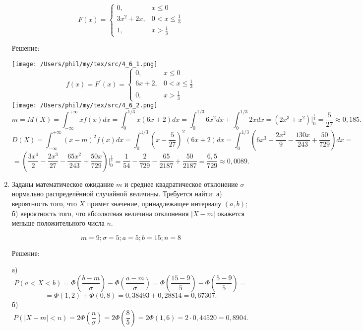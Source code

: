 \documentclass{article}
\renewcommand{\le}{\ensuremath{\leqslant}}
\begin{document}
\begin{enumerate}
\begin{equation*}
F(x) =
 \begin{cases}
  0, & x\le0\\
  3x^2+2x, & 0<x\le\frac{1}{3}\\
  1, & x>\frac{1}{3}
 \end{cases}
\end{equation*}
\begin{center}Решение:\end{center}
\texttt{[image: /Users/phil/my/tex/src/4\_6\_1.png]}
\begin{equation*}
f(x) = F^{\prime}(x) =
 \begin{cases}
  0, & x\le0\\
  6x+2, & 0<x\le\frac{1}{3}\\
  0, & x>\frac{1}{3}
 \end{cases}
\end{equation*}
\texttt{[image: /Users/phil/my/tex/src/4\_6\_2.png]}
$$m=M(X)=\int_{-\infty}^{+\infty} x f(x) dx=\int_{0}^{1/3} x(6x+2) dx=\int_{0}^{1/3} 6x^2dx + \int_{0}^{1/3} 2xdx=(2x^3+x^2)\bigg|_{0}^{\frac{1}{3}}=\frac{5}{27}\approx0,185.$$
$$D(X)=\int_{-\infty}^{+\infty} (x-m)^2 f(x) dx=\int_{0}^{1/3} \left(x-\frac{5}{27}\right)^2(6x+2) dx=\int_{0}^{1/3} \left(6x^3-\frac{2x^2}{9}-\frac{130x}{243}+\frac{50}{729}\right) dx=$$
$$=\left(\frac{3x^4}{2}-\frac{2x^3}{27}-\frac{65x^2}{243}+\frac{50x}{729}\right)\bigg|_{0}^{\frac{1}{3}}=\frac{1}{54}-\frac{2}{729}-\frac{65}{2187}+\frac{50}{2187}=\frac{6,5}{729}\approx0,0089.$$

\item %
Заданы математическое ожидание $m$ и среднее квадратическое отклонение $\sigma$ нормально распределённой случайной величины. \newline
Требуется найти: а) вероятность того, что $X$ примет значение, принадлежащее интервалу $(a, b)$; \newline
б) вероятность того, что абсолютная величина отклонения $|X-m|$ окажется меньше положительного числа $n$.

$$m=9;\sigma=5;a=5;b=15;n=8$$
\begin{center}Решение:\end{center}
а) $$P(a<X<b)=\Phi\left(\frac{b-m}{\sigma}\right)-\Phi\left(\frac{a-m}{\sigma}\right)=\Phi\left(\frac{15-9}{5}\right)-\Phi\left(\frac{5-9}{5}\right)=$$
$$=\Phi(1,2)+\Phi(0,8)=0,38493+0,28814=0,67307.$$
б)
$$P (|X-m| < n)= 2\Phi\left(\frac{n}{\sigma}\right)=2\Phi\left(\frac{8}{5}\right)=2\Phi(1,6)=2\cdot0,44520=0,8904.$$


\end{enumerate}
\end{document}
